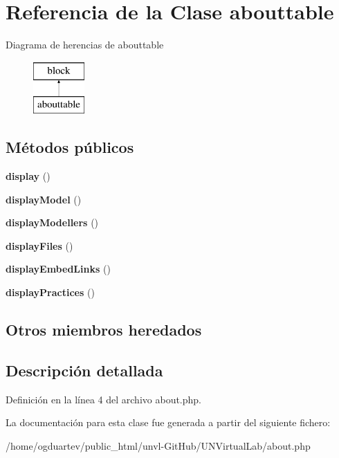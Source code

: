 \hypertarget{classabouttable}{}\section{Referencia de la Clase abouttable}
\label{classabouttable}
Diagrama de herencias de abouttable\begin{figure}[H]
\begin{center}
\leavevmode
\includegraphics[height=2.000000cm]{classabouttable}
\end{center}
\end{figure}
\subsection*{Métodos públicos}
\begin{DoxyCompactItemize}
\item 
\mbox{\label{classabouttable_ac0f2c0d925796601544d584613e05e47}} 
{\bfseries display} ()
\item 
\mbox{\label{classabouttable_a97836320a206e585f3e682fa570a55b3}} 
{\bfseries display\+Model} ()
\item 
\mbox{\label{classabouttable_a175c3aa085ab45e2783ee0f5e7929c30}} 
{\bfseries display\+Modellers} ()
\item 
\mbox{\label{classabouttable_aea286997a07d462392d4124cb11c38fe}} 
{\bfseries display\+Files} ()
\item 
\mbox{\label{classabouttable_a53647b9d4cec21fea7c3c5a591561d17}} 
{\bfseries display\+Embed\+Links} ()
\item 
\mbox{\label{classabouttable_a783812e4a907615c4d195905f695e170}} 
{\bfseries display\+Practices} ()
\end{DoxyCompactItemize}
\subsection*{Otros miembros heredados}


\subsection{Descripción detallada}


Definición en la línea 4 del archivo about.\+php.



La documentación para esta clase fue generada a partir del siguiente fichero\+:\begin{DoxyCompactItemize}
\item 
/home/ogduartev/public\+\_\+html/unvl-\/\+Git\+Hub/\+U\+N\+Virtual\+Lab/about.\+php\end{DoxyCompactItemize}
